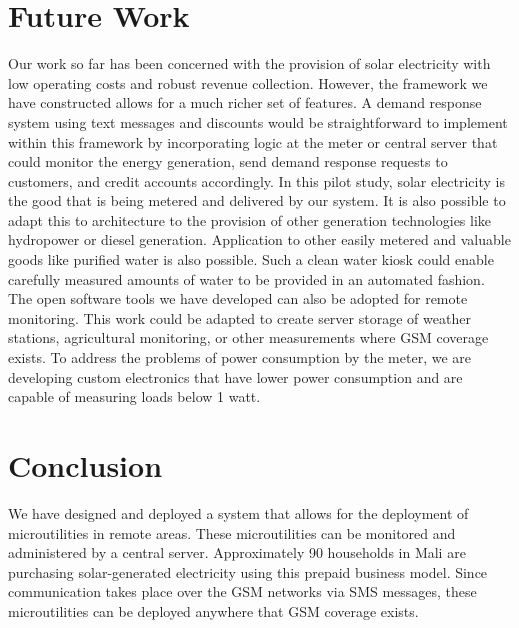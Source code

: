\documentclass{sig-alternate}
\begin{document}
\section{Future Work}
Our work so far has been concerned with the
provision of solar electricity with low operating costs and robust revenue
collection.
However, the framework we have constructed allows for a much
richer set of features.
A demand response system using text messages and discounts
would be straightforward to implement within this framework
by incorporating logic at the meter or central server that
could monitor the energy generation, send demand response
requests to customers, and credit accounts accordingly.
In this pilot study, solar electricity is the good that
is being metered and delivered by our
system.
It is also possible to adapt this to architecture
to the provision of other generation technologies like hydropower or
diesel generation.  
Application to other easily metered and valuable goods
like purified water is also possible.
Such a clean water kiosk could enable carefully measured amounts 
of water to be provided in an automated fashion.
The open software tools we have developed can also be adopted for
remote monitoring.  
This work could be adapted to create server storage of weather stations,
agricultural monitoring, or other measurements where GSM coverage exists.
To address the problems of power consumption by the meter,
we are developing custom electronics that have lower power consumption
and are capable of measuring loads below 1 watt.



\section{Conclusion}
We have designed and deployed a system that allows for the deployment
of microutilities in remote areas.  
These microutilities can be monitored
and administered by a central server.  
Approximately 90 households in Mali are purchasing solar-generated 
electricity using this prepaid business model. 
Since communication takes place
over the GSM networks via SMS messages, these microutilities can be
deployed anywhere that GSM coverage exists.




\end{document}

